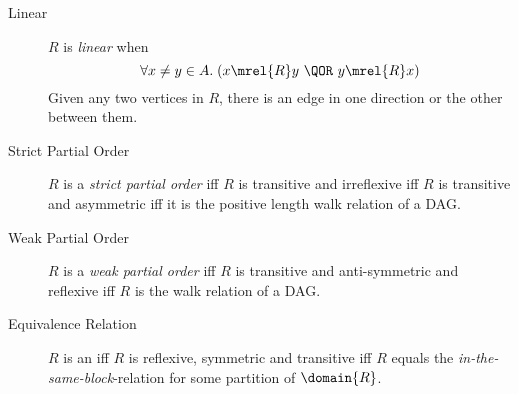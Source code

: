 \begin{description}
\iffalse
For any walk $v_0, v_1, \dots, v_k$ in~$G$ where $k \ge 2$,
$\diredge{v_0}{v_k}$ is in~$G$ (and, hence, $\diredge{v_i}{v_j}$ is
also in~$G$ for all $i < j$.
\fi

\item[Linear] $R$ is \emph{linear}%
when
\[
 \forall x \neq y \in A. \; (x \mrel{R} y\ \QOR\ y \mrel{R} x)
\]
Given any two vertices in $R$, there is an edge in one direction or the
other between them.

\item[Strict Partial Order] $R$ is a \emph{strict partial order}%
iff $R$ is transitive and irreflexive iff $R$ is transitive and
  asymmetric iff it is the positive length walk relation of a DAG.
  
\item[Weak Partial Order] $R$ is a \emph{weak partial order}%
iff $R$ is transitive and anti-symmetric and reflexive iff $R$ is the walk
  relation of a DAG.

\item[Equivalence Relation] $R$ is an \emph{} iff $R$
  is reflexive, symmetric and transitive iff $R$ equals the
  \emph{in-the-same-block}-relation for some partition of $\domain{R}$.

\end{description}

\endinput

